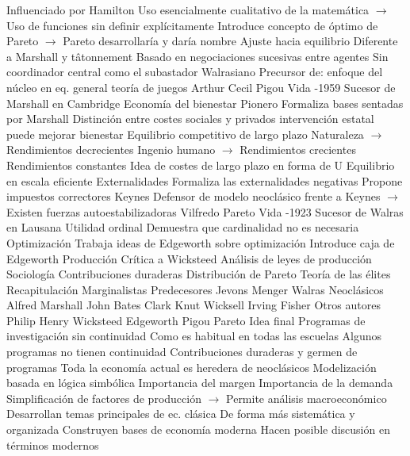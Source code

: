 \documentclass{nuevotema}
\begin{document}
\begin{esquemal}
				\4 Influenciado por Hamilton
				\4 Uso esencialmente cualitativo de la matemática
				\4[] $\to$ Uso de funciones sin definir explícitamente
				\4 Introduce concepto de óptimo de Pareto
				\4[] $\to$ Pareto desarrollaría y daría nombre
			\3 Ajuste hacia equilibrio
				\4 Diferente a Marshall y tâtonnement
				\4 Basado en negociaciones sucesivas entre agentes
				\4[] Sin coordinador central como el subastador Walrasiano
				\4 Precursor de:
				\4[] enfoque del núcleo en eq. general
				\4[] teoría de juegos
		\2 Arthur Cecil Pigou
			\3 Vida
				-1959
				\4 Sucesor de Marshall en Cambridge
			\3 Economía del bienestar
				\4 Pionero
				\4 Formaliza bases sentadas por Marshall
				\4 Distinción entre costes sociales y privados
				\4 intervención estatal puede mejorar bienestar
			\3 Equilibrio competitivo de largo plazo
				\4 Naturaleza $\to$ Rendimientos decrecientes
				\4 Ingenio humano $\to$ Rendimientos crecientes
				\4[$\Rightarrow$] Rendimientos constantes
				\4 Idea de costes de largo plazo en forma de U
				\4[] Equilibrio en escala eficiente
			\3 Externalidades
				\4 Formaliza las externalidades negativas
				\4 Propone impuestos correctores
			\3 Keynes
				\4 Defensor de modelo neoclásico frente a Keynes
				\4[] $\to$ Existen fuerzas autoestabilizadoras
		\2 Vilfredo Pareto
			\3 Vida
				-1923
				\4 Sucesor de Walras en Lausana
			\3 Utilidad ordinal
				\4 Demuestra que cardinalidad no es necesaria
			\3 Optimización
				\4 Trabaja ideas de Edgeworth sobre optimización
				\4 Introduce caja de Edgeworth
			\3 Producción
				\4 Crítica a Wicksteed
				\4 Análisis de leyes de producción
			\3 Sociología
				\4 Contribuciones duraderas
				\4 Distribución de Pareto
				\4 Teoría de las élites
	\1[] 
		\2 Recapitulación
			\3 Marginalistas
				\4 Predecesores
				\4 Jevons
				\4 Menger
				\4 Walras
			\3 Neoclásicos
				\4 Alfred Marshall
				\4 John Bates Clark
				\4 Knut Wicksell
				\4 Irving Fisher
			\3 Otros autores
				\4 Philip Henry Wicksteed
				\4 Edgeworth
				\4 Pigou
				\4 Pareto
		\2 Idea final
			\3 Programas de investigación sin continuidad
				\4 Como es habitual en todas las escuelas
				\4[] Algunos programas no tienen continuidad
			\3 Contribuciones duraderas y germen de programas
				\4 Toda la economía actual es heredera de neoclásicos
				\4[] Modelización basada en lógica simbólica
				\4[] Importancia del margen
				\4[] Importancia de la demanda
				\4[] Simplificación de factores de producción
				\4[] $\to$ Permite análisis macroeconómico
				\4 Desarrollan temas principales de ec. clásica
				\4[] De forma más sistemática y organizada
				\4[] Construyen bases de economía moderna
				\4[] Hacen posible discusión en términos modernos
\end{esquemal}
\end{document}
